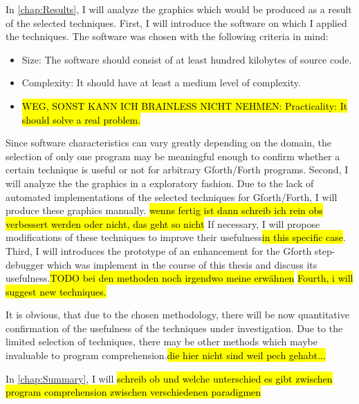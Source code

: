 In \autoref{chap:Results}, I will analyze the graphics which would be produced as a result of the selected techniques. First, I will introduce the software on which I applied the techniques. The software was chosen with the following criteria in mind:
\begin{itemize}
\item Size: The software should consist of at least hundred kilobytes of source code.
\item Complexity: It should have at least a medium level of complexity.
\item \hl{WEG, SONST KANN ICH BRAINLESS NICHT NEHMEN: Practicality: It should solve a real problem.}
\end{itemize}
Since software characteristics can vary greatly depending on the domain, the selection of only one program may be meaningful enough to confirm whether a certain technique is useful or not for arbitrary Gforth/Forth programs.
Second, I will analyze the the graphics in a exploratory fashion. Due to the lack of automated implementations of the selected techniques for Gforth/Forth, I will produce these graphics manually. \hl{wenns fertig ist dann schreib ich rein obs verbessert werden oder nicht, das geht so nicht} If necessary, I will propose modifications of these techniques to improve their usefulness\hl{in this specific case}.
Third, I will introduces the prototype of an enhancement for the Gforth step-debugger which was implement in the course of this thesis and discuss its usefulness.\hl{TODO bei den methoden noch irgendwo meine erwähnen}
\hl{Fourth, i will suggest new techniques.}

It is obvious, that due to the chosen methodology, there will be now quantitative confirmation of the usefulness of the techniques under investigation. Due to the limited selection of techniques, there may be other methods which maybe invaluable to program comprehension.\hl{die hier nicht sind weil pech gehabt...}

In \autoref{chap:Summary}, I will \hl{schreib ob und welche unterschied es gibt zwischen program comprehension zwischen verschiedenen paradigmen}